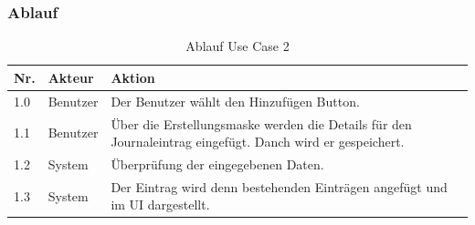 \subsubsection{Ablauf}
\begin{table}[H]
 \caption{Ablauf Use Case 2}
 \begin{tabularx}{\textwidth}{|l|l|X|}
     \hline
     \textbf{Nr.} & \textbf{Akteur} & \textbf{Aktion} \\
     \hline
     1.0          & Benutzer        & Der Benutzer w\"{a}hlt den Hinzuf\"{u}gen Button. \\
     \hline
     1.1          & Benutzer        & \"{U}ber die Erstellungsmaske werden die Details f\"{u}r den Journaleintrag eingef\"{u}gt. Danch wird er gespeichert. \\
     \hline
     1.2          & System          & \"{U}berpr\"{u}fung der eingegebenen Daten.  \\
     \hline
     1.3          & System          & Der Eintrag wird denn bestehenden Eintr\"{a}gen angef\"{u}gt und im UI dargestellt. \\
     \hline
 \end{tabularx}
 \label{table: Ablauf Use Case 2}
\end{table}
